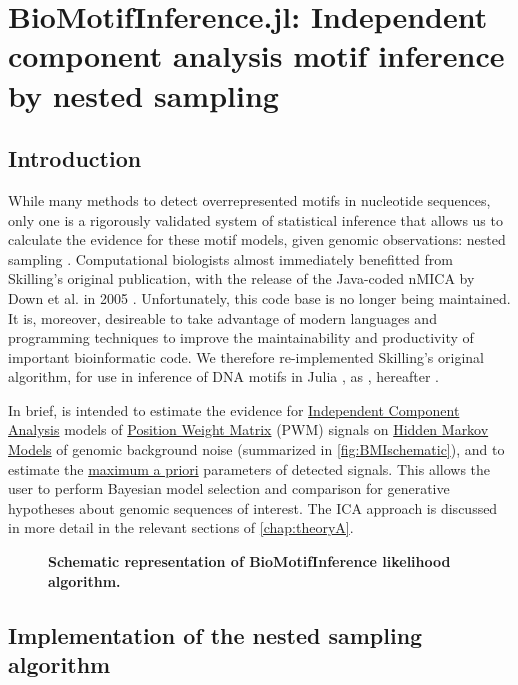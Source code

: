 \chapter{BioMotifInference.jl: Independent component analysis motif inference by nested sampling}
\label{chap:BMI}
\section{Introduction}
While many methods to detect overrepresented motifs in nucleotide sequences, only one is a rigorously validated system of statistical inference that allows us to calculate the evidence for these motif models, given genomic observations: nested sampling \cite{Skilling2006}. Computational biologists almost immediately benefitted from Skilling's original publication, with the release of the Java-coded nMICA by Down et al. in 2005 \cite{Down2005}. Unfortunately, this code base is no longer being maintained. It is, moreover, desireable to take advantage of modern languages and programming techniques to improve the maintainability and productivity of important bioinformatic code. We therefore re-implemented Skilling's original algorithm, for use in inference of DNA motifs in Julia \cite{Bezanson2015}, as , hereafter .

In brief,  is intended to estimate the evidence for \hyperref[ssec:ICA]{Independent Component Analysis} models of \hyperref[ssec:PWM]{Position Weight Matrix} (PWM) signals on \hyperref[ssec:HMM]{Hidden Markov Models} of genomic background noise (summarized in \autoref{fig:BMIschematic}), and to estimate the \hyperref[ssec:MLE]{maximum a priori} parameters of detected signals. This allows the user to perform Bayesian model selection and comparison for generative hypotheses about genomic sequences of interest. The ICA approach is discussed in more detail in the relevant sections of \autoref{chap:theoryA}.

\begin{figure}
    \caption{{\bf Schematic representation of BioMotifInference likelihood algorithm.}}
    \label{fig:BMIschematic}
\end{figure}

\section{Implementation of the nested sampling algorithm}

